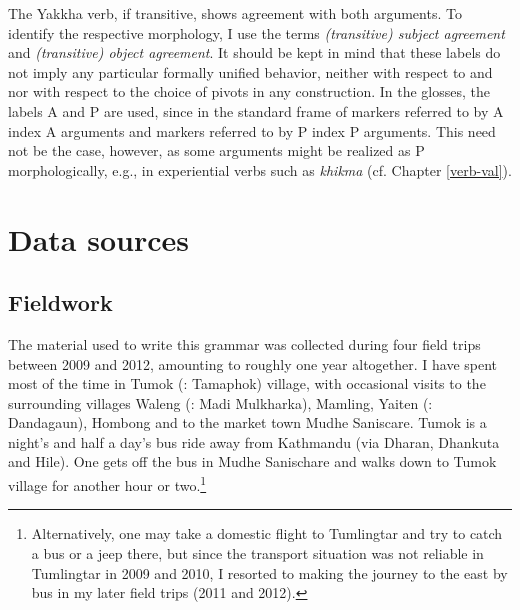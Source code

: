 The Yakkha verb, if transitive, shows agreement with both arguments. To identify the respective morphology, I use the terms \emph{(transitive) subject agreement}  and \emph{(transitive) object agreement}. It should be kept in mind that these labels do not imply any particular formally unified behavior, neither with respect to  and  nor with respect to the choice of pivots in any construction. In the glosses,  the labels A and P are used, since in the standard frame of  markers referred to by A index A arguments and markers referred to by P index P arguments. This need not be the case, however, as some  arguments might be realized as P morphologically, e.g., in experiential verbs such as \emph{khikma}  (cf. Chapter \ref{verb-val}).


\section{Data sources}\label{sources}

\subsection{Fieldwork}

The material used to write this grammar was collected during four field trips between 2009 and 2012, amounting to roughly one year altogether. I have spent most of the time in Tumok (: Tamaphok) village, with occasional visits to the surrounding villages Waleng (: Madi Mulkharka), Mamling, Yaiten (:  Dandagaun), Hombong and to the market town Mudhe Saniscare. Tumok is a night's and half a day's bus ride away from Kathmandu (via Dharan, Dhankuta and Hile). One gets off the bus in  Mudhe Sanischare and walks down to Tumok village for another hour or two.\footnote{Alternatively, one may take a domestic flight to Tumlingtar and try to catch a bus or a jeep there, but since the transport situation was not reliable in Tumlingtar in 2009 and 2010, I resorted to making the journey to the east by bus in my later field trips (2011 and 2012).}



